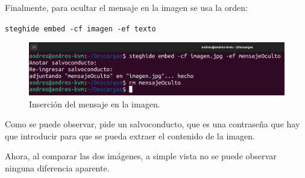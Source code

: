 \documentclass{article}
\begin{document}
\bigskip

Finalmente, para ocultar el mensaje en la imagen se usa la orden:

\verb|steghide embed -cf imagen -ef texto|

\begin{figure}[H]
    \includegraphics[width=\textwidth]{imagenes/Captura desde 2022-10-30 11-30-08.png}
    \caption{Inserción del mensaje en la imagen.}
\end{figure}

\bigskip

Como se puede observar, pide un salvoconducto, que es una contraseña que hay que introducir para que se pueda extraer el contenido de la imagen.

\bigskip

Ahora, al comparar las dos imágenes, a simple vista no se puede observar ninguna diferencia aparente.
\end{document}
